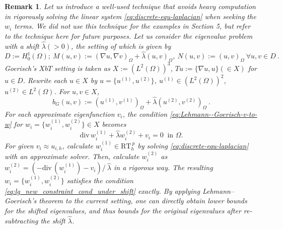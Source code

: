 \documentclass[a4,11pt]{article}
\numberwithin{equation}{section}
\newcommand{\Div}{\mbox{div}\mspace{3mu}}
\newtheorem{remark}[theorem]{Remark}
\begin{document}
\medskip

\begin{remark}
\label{remark:Lehmann--Goerisch-with-shift}
Let us introduce a well-used technique that avoids heavy computation in rigorously solving the linear system 
\eqref{eq:discrete-equ-laplacian} when seeking the $w_i$ terms.  We did not use this technique for the examples in Section 5, but refer to the technique here for future purposes. Let us consider the eigenvalue problem with a shift  $\widehat{\lambda}(>0)$, the setting of which is given by
$$
D:=H^1_0(\Omega); ~
M(u,v) :=(\nabla u, \nabla v)_\Omega+\widehat{\lambda} (u,v)_\Omega,~
N(u,v):=(u, v)_\Omega~ \forall u,v \in D\:.
$$
Goerisch's $XbT$ setting is taken as $X:=\left(L^2(\Omega)\right)^3$, $Tu:=\{\nabla u, u\}(\in X)$ for $u \in D$. 
Rewrite each $u\in X$ by $u=\{u^{(1)}, u^{(2)}\}$, $u^{(1)}\in \left(L^2(\Omega)\right)^2$, $u^{(2)} \in L^2(\Omega)$. 
For $u,v \in X$, 
$$
b_G({u},{v}) := ({ u^{(1)}},{v^{(1)}})_\Omega  + \widehat{\lambda} ({ u^{(2)}},{v^{(2)}})_\Omega ~.
$$
For each approximate eigenfunction $v_i$, the condition \cref{eq:Lehmann--Goerisch-v-to-w} for $w_i=\{w_i^{(1)},w_i^{(2)}\}\in X$  becomes 
\begin{equation}\label{eq:lg_new_constraint_cond_under_shift}
\Div w_i^{(1)} + \widehat{\lambda}  w_i^{(2)} + v_i=0~\text{ in } \Omega.
\end{equation}
For given $v_i\approx u_{i,h}$, calculate ${w}^{(1)}_i \in \text{RT}_h^{\:p}$ by solving 
\cref{eq:discrete-equ-laplacian} with an approximate  solver. 
Then, calculate $w_i^{(2)}$ as $w_i^{(2)} = (- \Div({w}^{(1)}_i ) - v_{i})/\:\widehat{\lambda}$ in a rigorous way. The resulting $w_i=\{w_i^{(1)},w_i^{(2)}\}$ satisfies the condition \cref{eq:lg_new_constraint_cond_under_shift} exactly. By applying Lehmann--Goerisch's theorem to the current setting, one can directly obtain lower bounds for the shifted eigenvalues, and thus bounds for the original eigenvalues after re-subtracting the shift $\widehat{\lambda}$.

\end{remark} 

\end{document}
